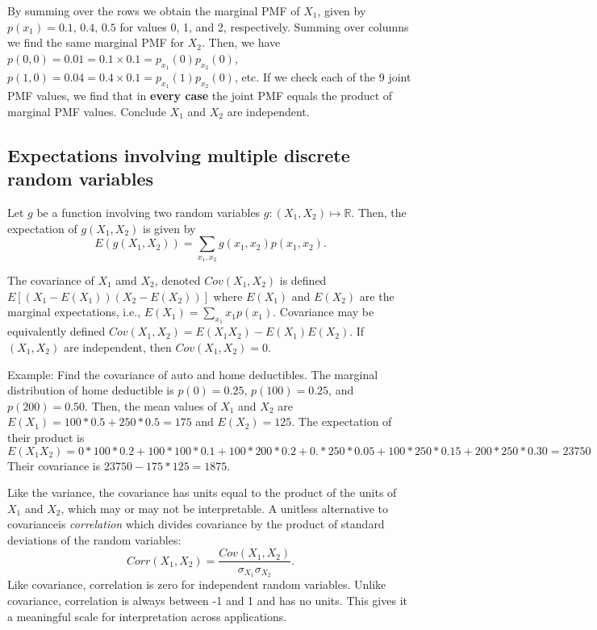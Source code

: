 \documentclass[]{book}
\begin{document}
By summing over the rows we obtain the marginal PMF of \(X_1\), given by
\(p(x_1) = 0.1,\, 0.4,\, 0.5\) for values \(0\), 1, and 2, respectively.
Summing over columns we find the same marginal PMF for \(X_2\). Then, we
have \(p(0,0) = 0.01 = 0.1\times 0.1 = p_{x_1}(0)p_{x_2}(0)\),
\(p(1,0) = 0.04 = 0.4\times 0.1 = p_{x_1}(1)p_{x_2}(0)\), etc. If we
check each of the 9 joint PMF values, we find that in \textbf{every
case} the joint PMF equals the product of marginal PMF values. Conclude
\(X_1\) and \(X_2\) are independent.

\subsection{Expectations involving multiple discrete random
variables}\label{expectations-involving-multiple-discrete-random-variables}

Let \(g\) be a function involving two random variables
\(g:(X_1,X_2)\mapsto \mathbb{R}\). Then, the expectation of
\(g(X_1,X_2)\) is given by
\[E(g(X_1,X_2)) = \sum_{x_1,x_2} g(x_1,x_2)p(x_1,x_2).\]

The covariance of \(X_1\) amd \(X_2\), denoted \(Cov(X_1,X_2)\) is
defined \(E[(X_1 - E(X_1))(X_2 - E(X_2))]\) where \(E(X_1)\) and
\(E(X_2)\) are the marginal expectations, i.e.,
\(E(X_1) = \sum_{x_1} x_1 p(x_1)\). Covariance may be equivalently
defined \(Cov(X_1, X_2) = E(X_1X_2)-E(X_1)E(X_2)\). If \((X_1,X_2)\) are
independent, then \(Cov(X_1,X_2) = 0\).

Example: Find the covariance of auto and home deductibles. The marginal
distribution of home deductible is \(p(0) = 0.25\), \(p(100) = 0.25\),
and \(p(200) = 0.50\). Then, the mean values of \(X_1\) and \(X_2\) are
\(E(X_1) = 100*0.5 + 250 * 0.5 = 175\) and \(E(X_2) = 125\). The
expectation of their product is
\[E(X_1X_2) = 0*100*0.2 + 100*100*0.1 + 100*200*0.2 + 0.*250*0.05 + 100*250*0.15 + 200*250*0.30=23750\]
Their covariance is \(23750-175*125 = 1875\).

Like the variance, the covariance has units equal to the product of the
units of \(X_1\) and \(X_2\), which may or may not be interpretable. A
unitless alternative to covarianceis \emph{correlation} which divides
covariance by the product of standard deviations of the random
variables:
\[Corr(X_1, X_2) = \frac{Cov(X_1,X_2)}{\sigma_{X_1}\sigma_{X_2}}.\] Like
covariance, correlation is zero for independent random variables. Unlike
covariance, correlation is always between -1 and 1 and has no units.
This gives it a meaningful scale for interpretation across applications.
\end{document}
